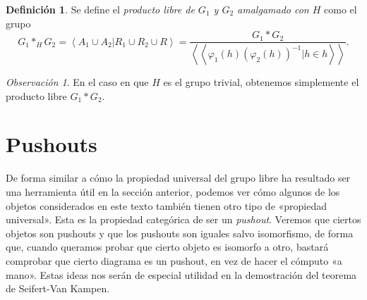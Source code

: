 \documentclass[12pt,a4paper]{book}
\theoremstyle{definition} \newtheorem{defn}[thm]{Definición}
\theoremstyle{definition} \newtheorem{ejemplo}[thm]{Ejemplo}
\theoremstyle{definition} \newtheorem{ejercicio}[thm]{Ejercicio}
\theoremstyle{remark} \newtheorem*{obs}{Observación}
\newcommand\gen[1]{\left\langle #1 \right\rangle}
\newcommand\ngen[1]{\left\langle\left\langle #1 \right\rangle \right\rangle}
\begin{document}
 \begin{defn}
  Se define el \emph{producto libre de $G_1$ y $G_2$ amalgamado con $H$} como el grupo
  \begin{equation*}
    G_1*_H G_2 = \gen{A_1\cup A_2 | R_1\cup R_2\cup R}= \frac{G_1*G_2}{\ngen{\varphi_1(h)(\varphi_2(h))^{-1}|h\in h}}.
  \end{equation*}
 \end{defn}
 \begin{obs}
   En el caso en que $H$ es el grupo trivial, obtenemos simplemente el producto libre $G_1*G_2$.
 \end{obs}

 \section{Pushouts}
 De forma similar a cómo la propiedad universal del grupo libre ha resultado ser una herramienta útil en la sección anterior, podemos ver cómo algunos de los objetos considerados en este texto también tienen otro tipo de «propiedad universal». Esta es la propiedad categórica de ser un \emph{pushout}. Veremos que ciertos objetos son pushouts y que los pushouts son iguales salvo isomorfismo, de forma que, cuando queramos probar que cierto objeto es isomorfo a otro, bastará comprobar que cierto diagrama es un pushout, en vez de hacer el cómputo «a mano». Estas ideas nos serán de especial utilidad en la demostración del teorema de Seifert-Van Kampen.
\end{document}
